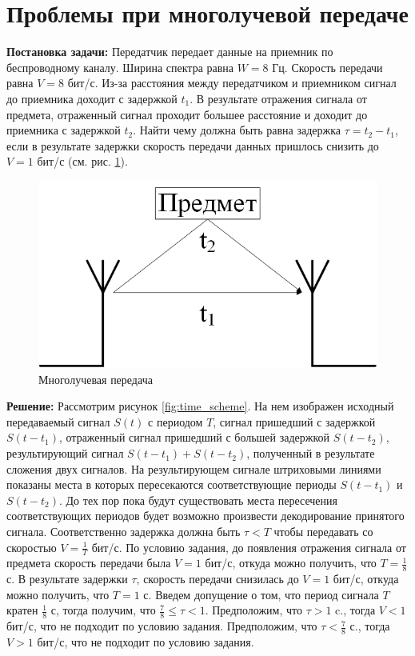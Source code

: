 \section{Проблемы при многолучевой передаче}

\textbf{Постановка задачи:}
Передатчик передает данные на приемник по беспроводному каналу.
Ширина спектра равна $W=8$ Гц.
Скорость передачи равна $V=8$ бит/с.
Из-за расстояния между передатчиком и приемником сигнал до
приемника доходит с задержкой $t_1$.
В результате отражения сигнала от предмета, отраженный сигнал
проходит большее расстояние и доходит до приемника с задержкой $t_2$.
Найти чему должна быть равна задержка $\tau=t_2-t_1$, если в результате
задержки скорость передачи данных пришлось снизить до $V=1$ бит/с
(см. рис. \ref{fig:structure_scheme}).

\begin{figure}[h]
	\centering
	\includegraphics[width=0.6\linewidth]{img/structure_scheme}
	\caption{Многолучевая передача}
	\label{fig:structure_scheme}
\end{figure}

\textbf{Решение:}
Рассмотрим рисунок \ref{fig:time_scheme}.
На нем изображен исходный передаваемый сигнал $S(t)$ с периодом $T$,
сигнал пришедший с задержкой $S(t-t_1)$,
отраженный сигнал пришедший с большей задержкой $S(t-t_2)$,
результирующий сигнал $S(t-t_1)+S(t-t_2)$, полученный в результате
сложения двух сигналов.
На результирующем сигнале штриховыми линиями показаны места
в которых пересекаются соответствующие периоды $S(t-t_1)$ и $S(t-t_2)$.
До тех пор пока будут существовать места пересечения соответствующих
периодов будет возможно произвести декодирование принятого сигнала.
Соответственно задержка должна быть $\tau < T$ чтобы передавать
со скоростью $V= \frac{1}{T}$ бит/с.
По условию задания, до появления отражения сигнала от предмета
скорость передачи была $V=1$ бит/с, откуда можно получить, что
$T= \frac{1}{8}$ с.
В результате задержки $\tau$, скорость передачи
снизилась до $V=1$ бит/с, откуда можно получить, что $T=1$ с.
Введем допущение о том, что период сигнала $T$ кратен $\frac{1}{8}$ с,
тогда получим, что $\frac{7}{8} \leq \tau < 1$.
Предположим, что $\tau > 1$ c., тогда $V<1$ бит/с, что не подходит
по условию задания.
Предположим, что $\tau < \frac{7}{8}$ с., тогда $V>1$ бит/с, что
не подходит по условию задания.

